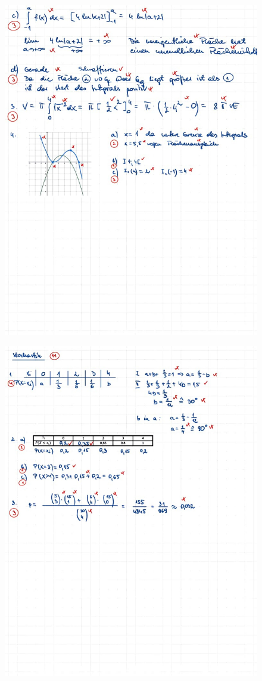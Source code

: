 \documentclass[a4paper,12pt]{article}
\begin{document}
\newpage
  \begin{figure}[H]
    \vspace{0cm}
    \centering
    \includegraphics[width=1.2\linewidth]{Q12_SA_240103_10.jpg}
  \end{figure}

\newpage
  \begin{figure}[H]
    \vspace{0cm}
    \centering
    \includegraphics[width=1.2\linewidth]{Q12_SA_240103_11.jpg}
  \end{figure}
\end{document}
